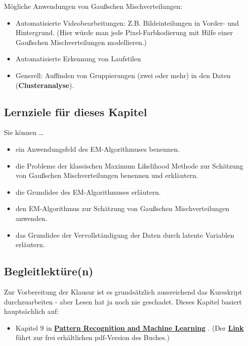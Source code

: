 \documentclass[
  ngerman,
]{book}
\providecommand{\tightlist}{%
  \setlength{\itemsep}{0pt}\setlength{\parskip}{0pt}}
\begin{document}
Mögliche Anwendungen von Gaußschen Mischverteilungen:

\begin{itemize}
\tightlist
\item
  Automatisierte Videobearbeitungen: Z.B. Bildeinteilungen in Vorder- und Hintergrund. (Hier würde man jede Pixel-Farbkodierung mit Hilfe einer Gaußschen Mischverteilungen modellieren.)
\item
  Automatisierte Erkennung von Laufstilen
\item
  Generell: Auffinden von Gruppierungen (zwei oder mehr) in den Daten (\textbf{Clusteranalyse}).
\end{itemize}

\hypertarget{lernziele-fuxfcr-dieses-kapitel}{%
\subsection*{Lernziele für dieses Kapitel}\label{lernziele-fuxfcr-dieses-kapitel}}

Sie können \ldots{}

\begin{itemize}
\tightlist
\item
  ein Anwendungsfeld des EM-Algorithmuses benennen.
\item
  die Probleme der klassischen Maximum Likelihood Methode zur Schätzung von Gaußschen Mischverteilungen benennen und erkläutern.
\item
  die Grundidee des EM-Algorithmuses erläutern.
\item
  den EM-Algorithmus zur Schätzung von Gaußschen Mischverteilungen anwenden.
\item
  das Grundidee der Vervollständigung der Daten durch latente Variablen erläutern.
\end{itemize}

\hypertarget{begleitlektuxfcren}{%
\subsection*{Begleitlektüre(n)}\label{begleitlektuxfcren}}

Zur Vorbereitung der Klausur ist es grundsätzlich aussreichend das Kursskript durchzuarbeiten - aber Lesen hat ja noch nie geschadet. Dieses Kapitel basiert hauptsächlich auf:

\begin{itemize}
\tightlist
\item
  Kapitel 9 in \href{https://www.microsoft.com/en-us/research/uploads/prod/2006/01/Bishop-Pattern-Recognition-and-Machine-Learning-2006.pdf}{\textbf{Pattern Recognition and Machine Learning}} \citep{book_Bishop2006}.
  (Der \href{https://www.microsoft.com/en-us/research/uploads/prod/2006/01/Bishop-Pattern-Recognition-and-Machine-Learning-2006.pdf}{\textbf{Link}} führt zur frei erhältlichen pdf-Version des Buches.)
\end{itemize}
\end{document}
